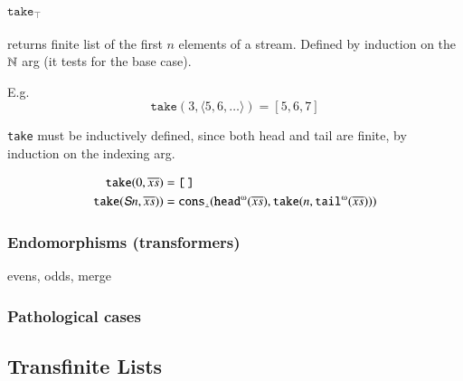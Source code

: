 \paragraph{\(\texttt{take}_{\scriptscriptstyle\top}\)}
returns finite list of the first \(n\) elements of a stream. Defined
by induction on the \(\Nat\) arg (it tests for the base case).

E.g.
\[\texttt{take}(3, \langle 5,6,\ldots\rangle) = [5,6,7]\]

\begin{prooftree}
\end{prooftree}

\texttt{take} must be inductively defined, since both head and tail
are finite, by induction on the indexing arg.

\begin{align} %
  \texttt{take}(0,\coseq{x}) &= \nillist \\
 \texttt{take}(\SNat{}n,\coseq{x})) &=
 \defnup{\Cons}(\cohead(\coseq{x}),\texttt{take}(n,\cotail(\coseq{x}))) \label{take:ind}
\end{align} %


\subsubsection{Endomorphisms (transformers)}

 evens, odds, merge

\subsubsection{Pathological cases}

\subsection{Transfinite Lists}

